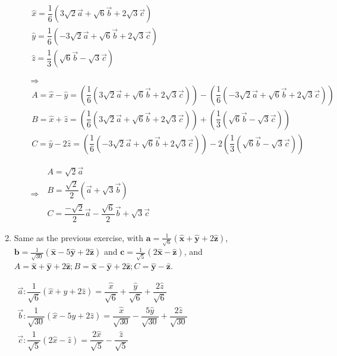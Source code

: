 \documentclass[fleqn]{article}
\begin{document}
\begin{enumerate}
\begin{enumerate}
$
\begin{array}{lll}
  \hat{x}= \dfrac{1}{6}(3\sqrt{2}\overrightarrow{a}+\sqrt{6}\overrightarrow{b}+2\sqrt{3}\overrightarrow{c}) \\
  \hat{y}= \dfrac{1}{6}(-3\sqrt{2}\overrightarrow{a}+\sqrt{6}\overrightarrow{b}+2\sqrt{3}\overrightarrow{c}) \\
  \hat{z}= \dfrac{1}{3}(\sqrt{6}\overrightarrow{b}-\sqrt{3}\overrightarrow{c})
  \end{array}  
$


$\Rightarrow$ 
$
\begin{array}{lll}
  A = \hat{x}-\hat{y}=(\dfrac{1}{6}(3\sqrt{2}\overrightarrow{a}+\sqrt{6}\overrightarrow{b}+2\sqrt{3}\overrightarrow{c}))-(\dfrac{1}{6}(-3\sqrt{2}\overrightarrow{a}+\sqrt{6}\overrightarrow{b}+2\sqrt{3}\overrightarrow{c})) \\
  B = \hat{x}+\hat{z}= (\dfrac{1}{6}(3\sqrt{2}\overrightarrow{a}+\sqrt{6}\overrightarrow{b}+2\sqrt{3}\overrightarrow{c}))+(\dfrac{1}{3}(\sqrt{6}\overrightarrow{b}-\sqrt{3}\overrightarrow{c}))\\
  C = \hat{y}-2\hat{z}=(\dfrac{1}{6}(-3\sqrt{2}\overrightarrow{a}+\sqrt{6}\overrightarrow{b}+2\sqrt{3}\overrightarrow{c}))-2(\dfrac{1}{3}(\sqrt{6}\overrightarrow{b}-\sqrt{3}\overrightarrow{c}))
\end{array}  
$

\bigbreak

$\Rightarrow$ 
$
\begin{array}{lll}
  A = \sqrt{2}\overrightarrow{a} \\
  B = \dfrac{\sqrt{2}}{2}(\overrightarrow{a}+\sqrt{3}\overrightarrow{b}) \\
  C = \dfrac{-\sqrt{2}}{2}\overrightarrow{a}-\dfrac{\sqrt{6}}{2}\overrightarrow{b}+\sqrt{3}\overrightarrow{c} 
\end{array}  
$

\end{enumerate}


\item Same as the previous exercise, with $\mathbf{a}=\frac{1}{\sqrt{6}} ( \mathbf{\hat{x}} + \mathbf{\hat{y}} + 2 \mathbf{\hat{z}} ) $, $\mathbf{b}=\frac{1}{\sqrt{30}} (\mathbf{\hat{x}} - 5\mathbf{\hat{y}} + 2\mathbf{\hat{z}})$ and $\mathbf{c}= \frac{1}{\sqrt{5}} ( 2 \mathbf{\hat{x} }- \mathbf{\hat{z} })$, and 
$A=\mathbf{\hat{x}}+\mathbf{\hat{y}}+2\mathbf{\hat{z}}; B=\mathbf{\hat{x}}-\mathbf{\hat{y}}+2\mathbf{\hat{z}}; C=\mathbf{\hat{y}}-\mathbf{\hat{z}}$. 

\noindent
$
\begin{array}{lll}
  \overrightarrow{a}: \dfrac{1}{\sqrt{6}}(\hat{x}+\hat{y}+2\hat{z})=\dfrac{\hat{x}}{\sqrt{6}}+\dfrac{\hat{y}}{\sqrt{6}}+\dfrac{2\hat{z}}{\sqrt{6}} \\
  \overrightarrow{b}: \dfrac{1}{\sqrt{30}}(\hat{x}-5\hat{y}+2\hat{z})=\dfrac{\hat{x}}{\sqrt{30}}-\dfrac{5\hat{y}}{\sqrt{30}}+\dfrac{2\hat{z}}{\sqrt{30}} \\
  \overrightarrow{c}: \dfrac{1}{\sqrt{5}}(2\hat{x}-\hat{z})=\dfrac{2\hat{x}}{\sqrt{5}}-\dfrac{\hat{z}}{\sqrt{5}}
  \end{array}  
$
\bigbreak


\end{enumerate}
\end{document}
